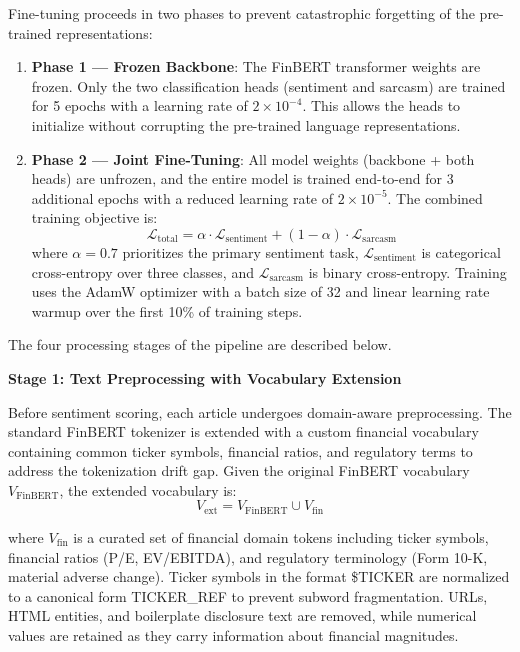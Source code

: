 \documentclass[12pt,a4paper]{article}
\begin{document}
Fine-tuning proceeds in two phases to prevent catastrophic forgetting of the pre-trained representations:
\begin{enumerate}
    \item \textbf{Phase 1 --- Frozen Backbone}: The FinBERT transformer weights are frozen. Only the two classification heads (sentiment and sarcasm) are trained for 5 epochs with a learning rate of $2 \times 10^{-4}$. This allows the heads to initialize without corrupting the pre-trained language representations.
    \item \textbf{Phase 2 --- Joint Fine-Tuning}: All model weights (backbone + both heads) are unfrozen, and the entire model is trained end-to-end for 3 additional epochs with a reduced learning rate of $2 \times 10^{-5}$. The combined training objective is:
    \begin{equation}
    \mathcal{L}_{\text{total}} = \alpha \cdot \mathcal{L}_{\text{sentiment}} + (1 - \alpha) \cdot \mathcal{L}_{\text{sarcasm}}
    \end{equation}
    where $\alpha = 0.7$ prioritizes the primary sentiment task, $\mathcal{L}_{\text{sentiment}}$ is categorical cross-entropy over three classes, and $\mathcal{L}_{\text{sarcasm}}$ is binary cross-entropy. Training uses the AdamW optimizer with a batch size of 32 and linear learning rate warmup over the first 10\% of training steps.
\end{enumerate}

The four processing stages of the pipeline are described below.

\textbf{Stage 1: Text Preprocessing with Vocabulary Extension}

Before sentiment scoring, each article undergoes domain-aware preprocessing. The standard FinBERT tokenizer is extended with a custom financial vocabulary containing common ticker symbols, financial ratios, and regulatory terms to address the tokenization drift gap. Given the original FinBERT vocabulary $V_{\text{FinBERT}}$, the extended vocabulary is:
\begin{equation}
V_{\text{ext}} = V_{\text{FinBERT}} \cup V_{\text{fin}}
\end{equation}

where $V_{\text{fin}}$ is a curated set of financial domain tokens including ticker symbols, financial ratios (P/E, EV/EBITDA), and regulatory terminology (Form 10-K, material adverse change). Ticker symbols in the format \$TICKER are normalized to a canonical form TICKER\_REF to prevent subword fragmentation. URLs, HTML entities, and boilerplate disclosure text are removed, while numerical values are retained as they carry information about financial magnitudes.
\end{document}
